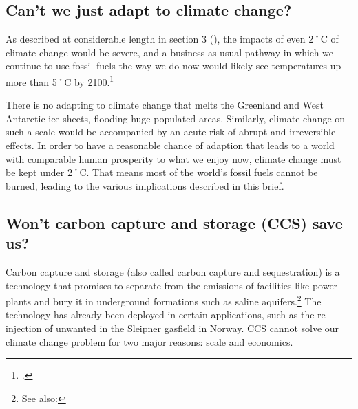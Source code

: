\documentclass[10pt]{article}
\begin{document}
	\subsection{Can't we just adapt to climate change?}
	\label{WhyNotAdapt}



As described at considerable length in section 3 (), the impacts of even 2˚C of climate change would be severe, and a business-as-usual pathway in which we continue to use fossil fuels the way we do now would likely see temperatures up more than 5˚C by 2100.\footcite[See also: ][]{IntoUnknownTerritory}


There is no adapting to climate change that melts the Greenland and West Antarctic ice sheets, flooding huge populated areas.
Similarly, climate change on such a scale would be accompanied by an acute risk of abrupt and irreversible effects.
In order to have a reasonable chance of adaption that leads to a world with comparable human prosperity to what we enjoy now, climate change must be kept under 2˚C.
That means most of the world's fossil fuels cannot be burned, leading to the various implications described in this brief.



	\subsection{Won't carbon capture and storage (CCS) save us?}
	\label{CCSSaves}



Carbon capture and storage (also called carbon capture and sequestration) is a technology that promises to separate  from the emissions of facilities like power plants and bury it in underground formations such as saline aquifers.\footnote{See also: }
The technology has already been deployed in certain applications, such as the re-injection of unwanted  in the Sleipner gasfield in Norway.
CCS cannot solve our climate change problem for two major reasons: scale and economics.
\end{document}
